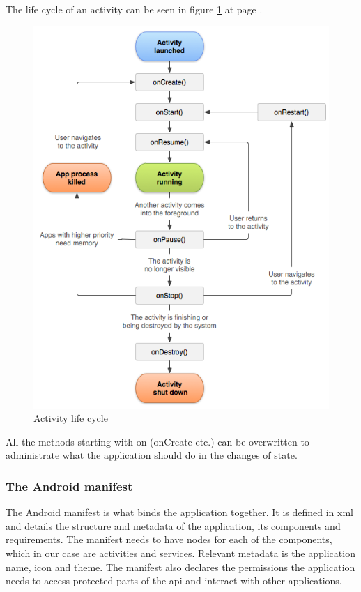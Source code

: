 The life cycle of an activity can be seen in figure \ref{fig:lifecycle} at page \pageref{fig:lifecycle}.
\begin{figure}
	\includegraphics[width=\textwidth]{activity_lifecycle}
	\caption{Activity life cycle \cite{bib:alc}}
	\label{fig:lifecycle}
\end{figure}

All the methods starting with on (onCreate etc.) can be overwritten to administrate what the application should do in the changes of state.

\subsubsection{The Android manifest}
The Android manifest \cite{bib:aman} is what binds the application together. It is defined in \gls{xml} and details the structure and metadata of the application, its components and requirements. The manifest needs to have nodes for each of the components, which in our case are activities and services. Relevant metadata is the application name, icon and theme. The manifest also declares the permissions the application needs to access protected parts of the \gls{api} and interact with other applications.

